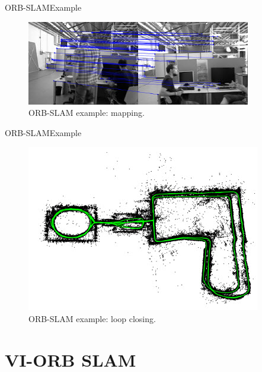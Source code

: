 \documentclass[aspectratio=169]{beamer}
\begin{document}
\begin{frame}{ORB-SLAM}{Example}
  \begin{figure}
\includegraphics[scale=0.9]{figs/ORBexMapping}
\caption{ORB-SLAM example: mapping.}
\end{figure}
\end{frame}

\begin{frame}{ORB-SLAM}{Example}
  \begin{figure}
\includegraphics[scale=0.7]{figs/ORBexLoopClosing}
\caption{ORB-SLAM example: loop closing.}
\end{figure}
\end{frame}

\section{VI-ORB SLAM}
\end{document}
